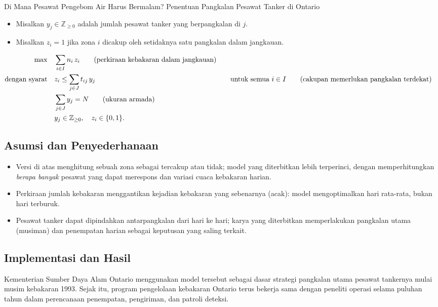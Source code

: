 \begin{casestudybox}{Di Mana Pesawat Pengebom Air Harus Bermalam? Penentuan Pangkalan Pesawat Tanker di Ontario}
\begin{itemize}
\item Misalkan $y_j \in \mathbb{Z}_{\geq 0}$ adalah jumlah pesawat tanker yang berpangkalan di $j$.
\item Misalkan $z_i = 1$ jika zona $i$ dicakup oleh setidaknya satu pangkalan dalam jangkauan.
\end{itemize}

\begin{align*}
\max \quad & \sum_{i \in I} n_i \, z_i   \tag{perkiraan kebakaran dalam jangkauan} \\
\mbox{dengan syarat}\quad        & z_i \leq \sum_{j \in J} t_{ij}\, y_j &&\quad \mbox{untuk semua } i \in I   \tag{cakupan memerlukan pangkalan terdekat} \\
             & \sum_{j \in J} y_j = N   \tag{ukuran armada} \\
             & y_j \in \mathbb{Z}_{\geq 0}, \quad z_i \in \{0,1\}.
\end{align*}

\subsection*{Asumsi dan Penyederhanaan}
\begin{itemize}
\item Versi di atas menghitung sebuah zona sebagai tercakup atau tidak; model yang diterbitkan lebih terperinci, dengan memperhitungkan \emph{berapa banyak} pesawat yang dapat merespons dan variasi cuaca kebakaran harian.
\item Perkiraan jumlah kebakaran menggantikan kejadian kebakaran yang sebenarnya (acak): model mengoptimalkan hari rata-rata, bukan hari terburuk.
\item Pesawat tanker dapat dipindahkan antarpangkalan dari hari ke hari; karya yang diterbitkan memperlakukan pangkalan utama (musiman) dan penempatan harian sebagai keputusan yang saling terkait.
\end{itemize}

\subsection*{Implementasi dan Hasil}
Kementerian Sumber Daya Alam Ontario menggunakan model tersebut sebagai dasar strategi pangkalan utama pesawat tankernya mulai musim kebakaran 1993. Sejak itu, program pengelolaan kebakaran Ontario terus bekerja sama dengan peneliti operasi selama puluhan tahun dalam perencanaan penempatan, pengiriman, dan patroli deteksi.


\end{casestudybox}
